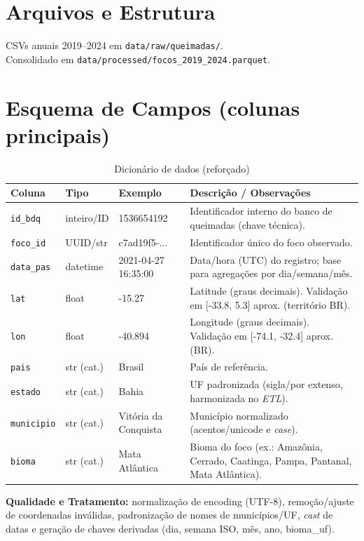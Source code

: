 \documentclass[12pt,a4paper]{report}
\begin{document}
\section{Arquivos e Estrutura}
CSVs anuais 2019--2024 em \texttt{data/raw/queimadas/}.
\\Consolidado em \texttt{data/processed/focos\_2019\_2024.parquet}.

\section{Esquema de Campos (colunas principais)}
\begin{table}[h]
\centering
\caption{Dicionário de dados (reforçado)}
\label{tab:dicionario}
\begin{tabular}{p{2.8cm} p{2.8cm} p{3.2cm} p{6.2cm}}
\toprule
\textbf{Coluna} & \textbf{Tipo} & \textbf{Exemplo} & \textbf{Descrição / Observações}\\
\midrule
\texttt{id\_bdq} & inteiro/ID & 1536654192 & Identificador interno do banco de queimadas (chave técnica).\\
\texttt{foco\_id} & UUID/str & c7ad19f5-... & Identificador único do foco observado.\\
\texttt{data\_pas} & datetime & 2021-04-27 16:35:00 & Data/hora (UTC) do registro; base para agregações por dia/semana/mês.\\
\texttt{lat} & float & -15.27 & Latitude (graus decimais). Validação em [-33.8, 5.3] aprox. (território BR).\\
\texttt{lon} & float & -40.894 & Longitude (graus decimais). Validação em [-74.1, -32.4] aprox. (BR).\\
\texttt{pais} & str (cat.) & Brasil & País de referência.\\
\texttt{estado} & str (cat.) & Bahia & UF padronizada (sigla/por extenso, harmonizada no \textit{ETL}).\\
\texttt{municipio} & str (cat.) & Vitória da Conquista & Município normalizado (acentos/unicode e \textit{case}).\\
\texttt{bioma} & str (cat.) & Mata Atlântica & Bioma do foco (ex.: Amazônia, Cerrado, Caatinga, Pampa, Pantanal, Mata Atlântica).\\
\bottomrule
\end{tabular}
\end{table}

\noindent\textbf{Qualidade e Tratamento:} normalização de encoding (UTF-8), remoção/ajuste de coordenadas inválidas, padronização de nomes de municípios/UF, \textit{cast} de datas e geração de chaves derivadas (dia, semana ISO, mês, ano, bioma\_uf).
\end{document}
